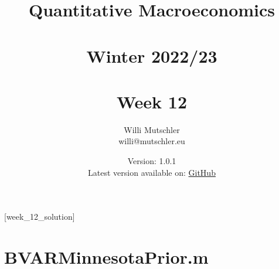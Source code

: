 
\newif\ifDisplaySolutions%


\title{Quantitative Macroeconomics\\~\\Winter 2022/23\\~\\Week 12}
\author{Willi Mutschler\\willi@mutschler.eu}
\date{Version: 1.0.1\\Latest version available on: \href{https://github.com/wmutschl/Quantitative-Macroeconomics/releases/latest/download/week_12.pdf}{GitHub}}
\maketitle\thispagestyle{empty}

\newpage
{}[week_12_solution]
\tableofcontents\thispagestyle{empty}\newpage

\setcounter{page}{1}
\newpage
\newpage
\printbibliography
\newpage
\appendix
\section{BVARMinnesotaPrior.m}


\ifDisplaySolutions
\newpage

\section{Solutions}

\fi

